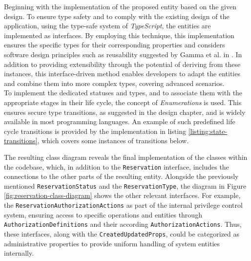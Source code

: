 Beginning with the implementation of the proposed entity based on the given design.
To ensure type safety and to comply with the existing design of the application, using the type-safe system of \textit{TypeScript}, the entities are implemented as interfaces.
By employing this technique, this implementation ensures the specific types for their corresponding properties and considers software design principles such as reusability suggested by Gamma et al. in \cite[p.~47ff]{gamma_design_2015}. 
In addition to providing extensibility through the potential of deriving from these instances, this interface-driven method enables developers to adapt the entities and combine them into more complex types, covering advanced scenarios. \\
\noindent To implement the dedicated statuses and types, and to associate them with the appropriate stages in their life cycle, the concept of \textit{Enumerations} is used. This ensures secure type transitions, as suggested in the design chapter, and is widely available in most programming languages.
An example of such predefined life cycle transitions is provided by the implementation in listing \ref{listing:state-transitions}, which covers some instances of transitions below. 



\noindent The resulting class diagram reveals the final implementation of the classes within the codebase, which, in addition to the \texttt{Reservation} interface, includes the connections to the other parts of the resulting entity.
Alongside the previously mentioned \texttt{ReservationStatus} and the \texttt{ReservationType}, the diagram in Figure \ref{fig:reservation-class-diagram} shows the other relevant interfaces. 
For example, the \texttt{ReservationAuthorizationActions} as part of the internal privilege control system, ensuring access to specific operations and entities through \texttt{AuthorizationDefinitions} and their according \texttt{AuthorizationActions}.
Thus, these interfaces, along with the \texttt{CreatedUpdatedProps}, could be categorized as administrative properties to provide uniform handling of system entities internally.

